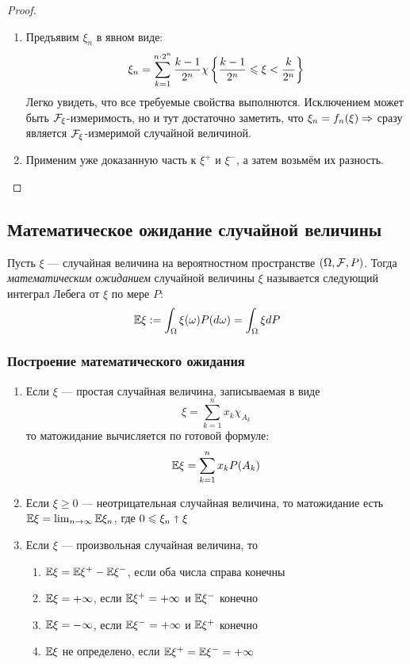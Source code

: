 \begin{proof}~
	\begin{enumerate}
		\item Предъявим $\xi_n$ в явном виде:
		\[
			\xi_n = \sum_{k = 1}^{n \cdot 2^n} \frac{k - 1}{2^n} \chi\left\{\frac{k - 1}{2^n} \leqslant \xi < \frac{k}{2^n}\right\}
		\]
		Легко увидеть, что все требуемые свойства выполнются. Исключением может быть $\mathcal{F}_\xi$-измеримость, но и тут достаточно заметить, что $\xi_n = f_n(\xi) \Rightarrow$ сразу является $\mathcal{F}_\xi$-измеримой случайной величиной.
		
		\item Применим уже доказанную часть к $\xi^+$ и $\xi^-$, а затем возьмём их разность.
	\end{enumerate}
\end{proof}

\subsection{Математическое ожидание случайной величины}

\begin{definition}
	Пусть $\xi$ --- случайная величина на вероятностном пространстве $(\Omega, \mathcal{F}, P)$. Тогда \textit{математическим ожиданием} случайной величины $\xi$ называется следующий интеграл Лебега от $\xi$ по мере $P$:
	\[
		\mathbb{E}\xi := \int_\Omega \xi(\omega)P(d\omega) = \int_\Omega \xi dP
	\]
\end{definition}

\subsubsection*{Построение математического ожидания}

\begin{enumerate}
	\item Если $\xi$ --- простая случайная величина, записываемая в виде
	\[
		\xi = \sum_{k = 1}^n x_k\chi_{A_k}
	\]
	то матожидание вычисляется по готовой формуле:
	\[
		\mathbb{E}\xi = \sum_{k = 1}^n x_kP(A_k)
	\]
	
	\item Если $\xi \ge 0$ --- неотрицательная случайная величина, то матожидание есть $\mathbb{E}\xi = \lim_{n \to \infty} \mathbb{E}\xi_n$, где $0 \leqslant \xi_n \shortuparrow \xi$
	
	\item Если $\xi$ --- произвольная случайная величина, то 
	\begin{enumerate}
		\item $\mathbb{E}\xi = \mathbb{E}\xi^+ - \mathbb{E}\xi^-$, если оба числа справа конечны
		
		\item $\mathbb{E}\xi = +\infty$, если $\mathbb{E}\xi^+ = +\infty$ и $\mathbb{E}\xi^-$ конечно
		
		\item $\mathbb{E}\xi = -\infty$, если $\mathbb{E}\xi^- = +\infty$ и $\mathbb{E}\xi^+$ конечно
		
		\item $\mathbb{E}\xi$ не определено, если $\mathbb{E}\xi^+ = \mathbb{E}\xi^- = +\infty$
	\end{enumerate}
\end{enumerate}

